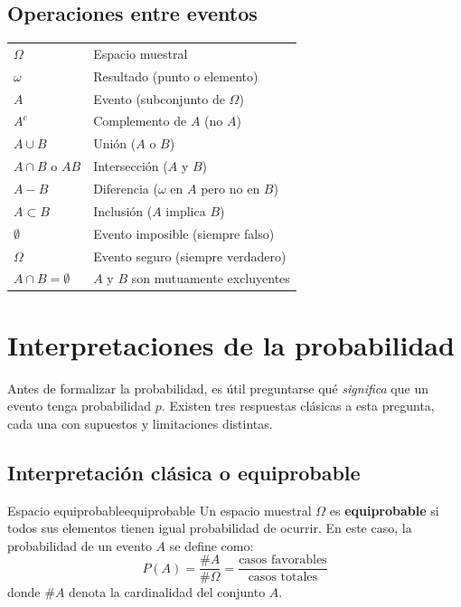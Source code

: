 \documentclass[12pt, a4paper]{book}
\numberwithin{equation}{chapter}
\begin{document}
\subsection{Operaciones entre eventos}

\begin{center}
	\begin{tabular}{@{}ll@{}}
		$\Omega$              & Espacio muestral \\[4pt]
		$\omega$              & Resultado (punto o elemento) \\[4pt]
		$A$                   & Evento (subconjunto de $\Omega$) \\[4pt]
		$A^c$                 & Complemento de $A$ (no $A$) \\[4pt]
		$A \cup B$            & Unión ($A$ o $B$) \\[4pt]
		$A \cap B$ o $AB$     & Intersección ($A$ y $B$) \\[4pt]
		$A - B$               & Diferencia ($\omega$ en $A$ pero no en $B$) \\[4pt]
		$A \subset B$         & Inclusión ($A$ implica $B$) \\[4pt]
		$\emptyset$           & Evento imposible (siempre falso) \\[4pt]
		$\Omega$              & Evento seguro (siempre verdadero) \\[4pt]
		$A \cap B = \emptyset$& $A$ y $B$ son mutuamente excluyentes \\
	\end{tabular}
\end{center}

\section{Interpretaciones de la probabilidad}

Antes de formalizar la probabilidad, es útil preguntarse qué \textit{significa} que un evento tenga probabilidad 
$p$. Existen tres respuestas clásicas a esta pregunta, cada una con 
supuestos y limitaciones distintas.

\subsection{Interpretación clásica o equiprobable}

\begin{definicion}{Espacio equiprobable}{equiprobable}
	Un espacio muestral $\Omega$ es \textbf{equiprobable} si todos sus 
	elementos tienen igual probabilidad de ocurrir. En este caso, la 
	probabilidad de un evento $A$ se define como:
	\[
	P(A) = \frac{\#A}{\#\Omega} = \frac{\text{casos favorables}}
	{\text{casos totales}}
	\]
	donde $\#A$ denota la cardinalidad del conjunto $A$.
\end{definicion}
\end{document}
